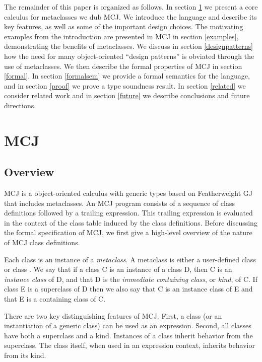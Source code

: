 \documentclass[nocopyrightspace,10pt]{acm-sigplan}
\begin{document}
The remainder of this paper is organized as follows.  In section
\ref{MCJ} we present a core calculus for metaclasses we dub MCJ.
We introduce the language and describe its key features, as
well as some of the important design choices.  The motivating examples
from the introduction are presented in MCJ in section \ref{examples},
demonstrating the benefits of metaclasses. We discuss in section
\ref{designpatterns} how the need for many object-oriented ``design
patterns'' is obviated through the use of metaclasses. We then
describe the formal properties of MCJ in section \ref{formal}.  In section
\ref{formalsem} we provide a formal semantics for the language, and in
section \ref{proof} we prove a type soundness result.  In section
\ref{related} we consider related work and in section \ref{future} we
describe conclusions and future directions.


\section{MCJ}
\label{MCJ}

\subsection{Overview}

\label{MCJintro}

MCJ is a object-oriented calculus with generic types based on
Featherweight GJ that includes metaclasses. An MCJ program consists of
a sequence of class definitions followed by a trailing
expression. This trailing expression is evaluated in the context of
the class table induced by the class definitions.  Before discussing
the formal specification of MCJ, we first give a high-level overview
of the nature of MCJ class definitions.

Each class is an instance of a \emph{metaclass}.  A metaclass is
either a user-defined class or class {}.  We say that if a
class {\txt C} is an instance of a class {\txt D}, then {\txt C} is an
\emph{instance class} of {\txt D}, and that {\txt D} is the
\emph{immediate containing class}, or \emph{kind}, of {\txt C}.  If
class {\txt E} is a superclass of {\txt D} then we also say that {\txt
C} is an instance class of {\txt E} and that {\txt E} is a containing
class of {\txt C}.

There are two key distinguishing features of MCJ. First, a class (or
an instantiation of a generic class) can be used as an expression.
Second, all classes have both a superclass and a kind. Instances of a
class inherit behavior from the superclass. The class itself, when
used in an expression context, inherits behavior from its kind.
\end{document}
